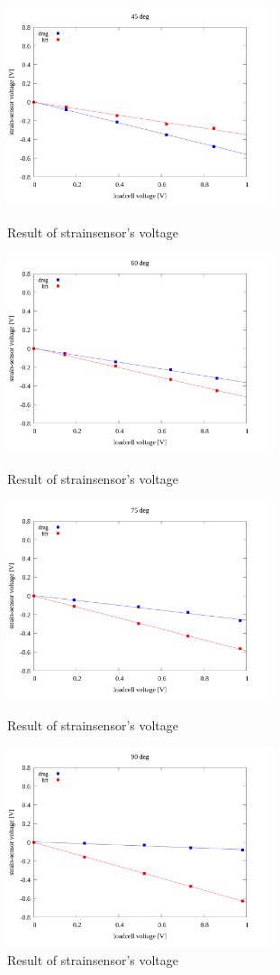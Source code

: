 \documentclass[twocolumn,a4j]{jsarticle}
\begin{document}
\begin{figure}[htbp]
    \footnotesize
    \begin{center}
        \includegraphics[width=78mm]{../images/linear/45_linear.png}
        \caption{Result of strainsensor's voltage}
        \includegraphics[width=78mm]{../images/linear/60_linear.png}
        \caption{Result of strainsensor's voltage}
        \includegraphics[width=78mm]{../images/linear/75_linear.png}
        \caption{Result of strainsensor's voltage}
        \includegraphics[width=78mm]{../images/linear/90_linear.png}
        \caption{Result of strainsensor's voltage}
    \end{center}
\end{figure}
\end{document}
